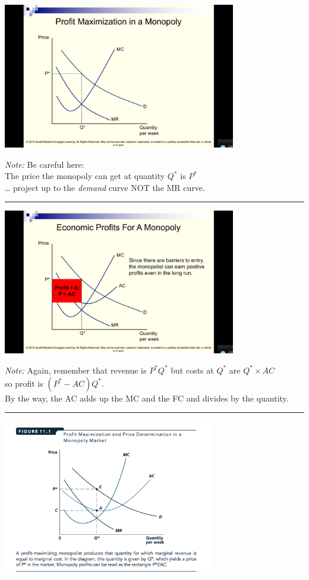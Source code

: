 \documentclass[]{article}
\begin{document}
\includegraphics[height=2.5in]{picsfigs/monopprofit3.png}

\emph{Note:}
Be careful here:\\
The price the monopoly can get at quantity \(Q^*\) is \(P^*\)\\
\ldots{} project up to the \emph{demand} curve NOT the MR curve.

\begin{center}\rule{0.5\linewidth}{\linethickness}\end{center}

\includegraphics[height=2.5in]{picsfigs/monopprofit4.png}

\emph{Note:}
Again, remember that revenue is \(P^*Q^*\) but costs at \(Q^*\) are \(Q^* \times AC\)\\
so profit is \((P^*-AC)Q^*\).\\
By the way, the AC adds up the MC and the FC and divides by the quantity.

\begin{center}\rule{0.5\linewidth}{\linethickness}\end{center}

\includegraphics[height=2.7in]{picsfigs/monopprofitmax.png}
\end{document}
